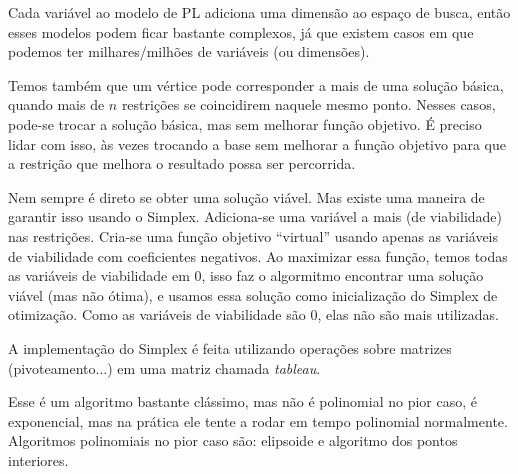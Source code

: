 Cada variável ao modelo de PL adiciona uma dimensão ao espaço de busca, então esses modelos podem ficar bastante complexos, já que existem casos em que podemos ter milhares/milhões de variáveis (ou dimensões).

Temos também que um vértice pode corresponder a mais de uma solução básica, quando mais de $n$ restrições se coincidirem naquele mesmo ponto. Nesses casos, pode-se trocar a solução básica, mas sem melhorar função objetivo. É preciso lidar com isso, às vezes trocando a base sem melhorar a função objetivo para que a restrição que melhora o resultado possa ser percorrida.

Nem sempre é direto se obter uma solução viável. Mas existe uma maneira de garantir isso usando o Simplex. Adiciona-se uma variável a mais (de viabilidade) nas restrições. Cria-se uma função objetivo ``virtual'' usando apenas as variáveis de viabilidade com coeficientes negativos. Ao maximizar essa função, temos todas as variáveis de viabilidade em $0$, isso faz o algormitmo encontrar uma solução viável (mas não ótima), e usamos essa solução como inicialização do Simplex de otimização. Como as variáveis de viabilidade são 0, elas não são mais utilizadas.

A implementação do Simplex é feita utilizando operações sobre matrizes (pivoteamento...) em uma matriz chamada \textit{tableau}.

Esse é um algoritmo bastante clássimo, mas não é polinomial no pior caso, é exponencial, mas na prática ele tente a rodar em tempo polinomial normalmente. Algoritmos polinomiais no pior caso são: elipsoide e algoritmo dos pontos interiores.
